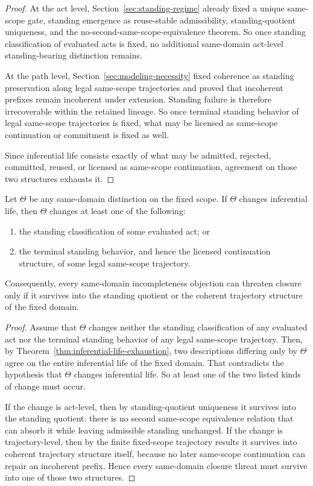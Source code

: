 \begin{proof}
At the act level, Section~\ref{sec:standing-regime} already fixed a unique same-scope gate, standing emergence as reuse-stable admissibility, standing-quotient uniqueness, and the no-second-same-scope-equivalence theorem. So once standing classification of evaluated acts is fixed, no additional same-domain act-level standing-bearing distinction remains.

At the path level, Section~\ref{sec:modeling-necessity} fixed coherence as standing preservation along legal same-scope trajectories and proved that incoherent prefixes remain incoherent under extension. Standing failure is therefore irrecoverable within the retained lineage. So once terminal standing behavior of legal same-scope trajectories is fixed, what may be licensed as same-scope continuation or commitment is fixed as well.

Since inferential life consists exactly of what may be admitted, rejected, committed, reused, or licensed as same-scope continuation, agreement on those two structures exhausts it.
\end{proof}

\begin{theorem}
\label{thm:closure-relevance-transmission}
Let $\Theta$ be any same-domain distinction on the fixed scope. If $\Theta$ changes inferential life, then $\Theta$ changes at least one of the following:
\begin{enumerate}
  \item the standing classification of some evaluated act; or
  \item the terminal standing behavior, and hence the licensed continuation structure, of some legal same-scope trajectory.
\end{enumerate}
Consequently, every same-domain incompleteness objection can threaten closure only if it survives into the standing quotient or the coherent trajectory structure of the fixed domain.
\end{theorem}

\begin{proof}
Assume that $\Theta$ changes neither the standing classification of any evaluated act nor the terminal standing behavior of any legal same-scope trajectory. Then, by Theorem~\ref{thm:inferential-life-exhaustion}, two descriptions differing only by $\Theta$ agree on the entire inferential life of the fixed domain. That contradicts the hypothesis that $\Theta$ changes inferential life. So at least one of the two listed kinds of change must occur.

If the change is act-level, then by standing-quotient uniqueness it survives into the standing quotient: there is no second same-scope equivalence relation that can absorb it while leaving admissible standing unchanged. If the change is trajectory-level, then by the finite fixed-scope trajectory results it survives into coherent trajectory structure itself, because no later same-scope continuation can repair an incoherent prefix. Hence every same-domain closure threat must survive into one of those two structures.
\end{proof}

